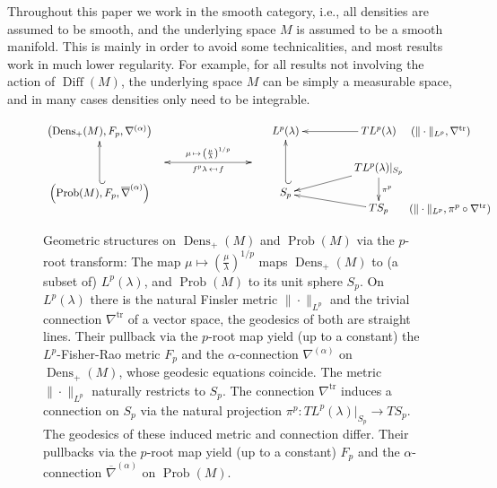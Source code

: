 \documentclass[11pt]{amsart}
\theoremstyle{definition}
\newcommand{\dx}{\lambda}
\newcommand{\Prob}{\operatorname{Prob}(M)}
\newcommand{\Dens}{\operatorname{Dens}_+(M)}
\newcommand{\Diff}{\operatorname{Diff}(M)}
\newcommand{\ntr}{\nabla^{\text{tr}}}
\begin{document}
Throughout this paper we work in the smooth category, i.e., all densities are assumed to be smooth, and the underlying space $M$ is assumed to be a smooth manifold.
This is mainly in order to avoid some technicalities, and most results work in much lower regularity.
For example, for all results not involving the action of $\Diff$, the underlying space $M$ can be simply a measurable space, and in many cases densities only need to be integrable.


\begin{figure}
    \centering
    \[
\begin{xy}
(-60,0)*+{\left(\Prob,F_p,\overline{\nabla}^{(\alpha)}\right)}="Pr";
(-60,3)*+{}="Pr1";
(-60,20)*+{\left(\Dens,F_p,\nabla^{(\alpha)}\right)}="De";
(0,0)*+{S_p}="S";
(0,3)*+{}="S'";
(0,20)*+{L^p(\dx)}="Lp";
(30,20)*+{TL^p(\dx)}="TLp";
(50,20)*+{\left(\|\cdot\|_{L^p},\ntr\right)}="GLp";
(30,8)*+{TL^p(\dx)|_{S_p}}="TLpS";
(30,-5)*+{TS_p}="TS";
(53,-5)*+{\left(\|\cdot\|_{L^p},\pi^p\circ \ntr\right)}="GS";
{\ar@{->}^{\pi^p}"TLpS";"TS"};
{\ar@{->}^{}"TLp";"Lp"};
{\ar@{->}^{}"TLpS";"S"};
{\ar@{->}^{}"TS";"S"};
{\ar@{_{(}->}^{}"Pr1";"De"};
{\ar@{_{(}->}^{}"S'";"Lp"};
(-40,10)*+{}="x_1";
(-10,10)*+{}="x_2";
{\ar@{<->}^{\mu\,\mapsto \,\left(\frac{\mu}{\dx}\right)^{1/p}}_{f^p\dx\, \mapsfrom \,f}"x_1";"x_2"};
\end{xy}
\]
    \caption{Geometric structures on $\Dens$ and $\Prob$ via the $p$-root transform: The map $\mu \mapsto \left(\frac{\mu}{\dx}\right)^{1/p}$ maps $\Dens$ to (a subset of) $L^p(\dx)$, and $\Prob$ to its unit sphere $S_p$. 
    On $L^p(\dx)$ there is the natural Finsler metric $\|\cdot\|_{L^p}$ and the trivial connection $\nabla^{\text{tr}}$ of a vector space, the geodesics of both are straight lines. 
    Their pullback via the $p$-root map yield (up to a constant) the $L^p$-Fisher-Rao metric $F_p$ and the $\alpha$-connection $\nabla^{(\alpha)}$ on $\Dens$, whose geodesic equations coincide.  
    The metric $\|\cdot\|_{L^p}$ naturally restricts to $S_p$.
    The connection $\nabla^{\text{tr}}$ induces a connection on $S_p$ via the natural projection $\pi^p: TL^p(\dx)|_{S_p} \to TS_p$.
    The geodesics of these induced metric and connection differ.
    Their pullbacks via the $p$-root map yield (up to a constant) $F_p$ and the $\alpha$-connection $\overline{\nabla}^{(\alpha)}$ on $\Prob$.
    }
    \label{fig:p_root}
\end{figure}
\end{document}
